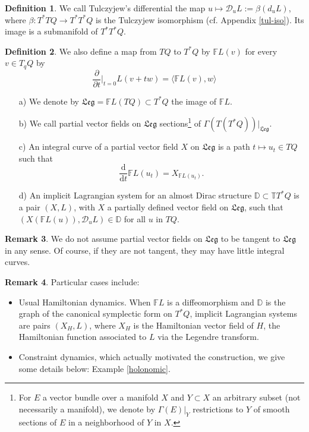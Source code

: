 \documentclass[a4paper,12pt]{amsart}
\theoremstyle{definition}
\newtheorem{Definition}{Definition}[section]
\newtheorem{Remark}[Definition]{Remark}
\newcommand{\leg}{\mathfrak{Leg}}
\begin{document}
\begin{Definition} We call Tulczyjew's differential the map $u\mapsto {\mathcal D}_uL := \beta (d_uL)$, where $\beta:T^*TQ\to T^*T^*Q$ is the Tulczyjew isomorphism (cf. Appendix \ref{tul-iso}). Its image is a submanifold of $T^*T^*Q$.
\end{Definition}



\begin{Definition}
We also define a map from $TQ$ to $T^* Q $ by $\mathbb{F}L(v)$ for every $v \in T_q Q$ by
 $$ \frac{\partial}{\partial t}{\Big|_{t=0}} L( v + tw) = \langle \mathbb{F}L(v) , w \rangle $$

\begin{enumerate}
    \item[a)] We denote by $\leg =\mathbb FL(TQ) \subset T^*Q$ the 
image of $\mathbb{F}L$.
    \item[b)] We call partial vector fields on $\leg$ sections\footnote{For $E$ a vector bundle over a manifold $X$ and $Y \subset X$ an arbitrary subset (not necessarily a manifold), we denote by $\Gamma(E)|_Y  $ 
    restrictions to $Y$ of smooth sections of $E$ in a neighborhood of $Y$ in $X$.} of $\Gamma(T(T^*Q))|_{\leg} $.
    \item[c)] 
An integral curve of a partial vector field $X$ on $\leg$   is a path $t \mapsto u_t \in TQ$ such that
 $$ \frac{{\mathrm d} }{{\mathrm d}t} \mathbb{F}L(u_t) =  X_{ \mathbb{F}L(u_t)}  .$$
 \item[d)] An implicit Lagrangian system for an almost Dirac structure  $\mathbb{D} \subset \mathbb{T}T^*Q$ is a pair $(X, L)$, with $X$ a partially defined vector field on $\leg $, such that   $(X(\mathbb FL(u)),  \mathcal D_uL)\in {\mathbb D}$ for all $u$ in $TQ$.
\end{enumerate} 
\end{Definition}

\begin{Remark}
We do not assume partial vector fields on $ \leg$ to be tangent to $\leg$ in any sense.  Of course, if they are not tangent, they may have little integral curves.
\end{Remark}





\begin{Remark}
Particular cases include:   
\begin{itemize}
    \item Usual Hamiltonian dynamics. When $\mathbb FL$ is a diffeomorphism and $\mathbb D$ is the graph of the canonical symplectic form on $T^*Q$, implicit Lagrangian systems are pairs $(X_H,L)$, where $X_H$ is the Hamiltonian vector field of {$H$, the Hamiltonian function associated to $L$ via the Legendre transform.}
\item Constraint dynamics, which actually motivated the construction, we give some details below: Example \ref{holonomic}. 
\end{itemize}

\end{Remark}
\end{document}
